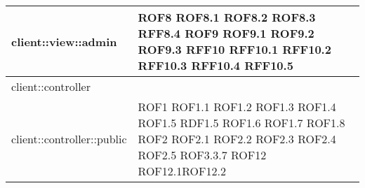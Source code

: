 \begin{center}
\begin{longtable}{| p{9cm} | p{4cm} |}
\hline
client::view::admin  &  ROF8 \newline ROF8.1 \newline ROF8.2 \newline ROF8.3 \newline RFF8.4 \newline ROF9 \newline ROF9.1 \newline ROF9.2 \newline ROF9.3 \newline RFF10 \newline RFF10.1 \newline RFF10.2 \newline RFF10.3 \newline RFF10.4 \newline RFF10.5 \newline \\
\hline
client::controller  &  \\
\hline
client::controller::public  &  ROF1 \newline ROF1.1 \newline ROF1.2 \newline ROF1.3 \newline ROF1.4 \newline ROF1.5 \newline RDF1.5 \newline ROF1.6 \newline ROF1.7 \newline ROF1.8 \newline ROF2 \newline ROF2.1 \newline ROF2.2 \newline ROF2.3 \newline ROF2.4 \newline ROF2.5  \newline ROF3.3.7 \newline ROF12 \newline ROF12.1\newline ROF12.2  \newline \\
\hline

\end{longtable}
\end{center}
